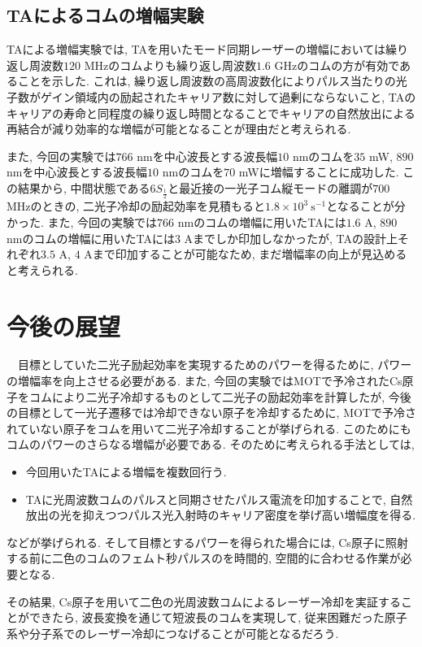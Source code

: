 \documentclass[uplatex, dvipdfmx, a4paper, report, papersize, 11pt]{jsbook}
\begin{document}
\subsection{TAによるコムの増幅実験}
TAによる増幅実験では, TAを用いたモード同期レーザーの増幅においては繰り返し周波数$120$ MHzのコムよりも繰り返し周波数$1.6$ GHzのコムの方が有効であることを示した. これは, 繰り返し周波数の高周波数化によりパルス当たりの光子数がゲイン領域内の励起されたキャリア数に対して過剰にならないこと, TAのキャリアの寿命と同程度の繰り返し時間となることでキャリアの自然放出による再結合が減り効率的な増幅が可能となることが理由だと考えられる. \par
また, 今回の実験では$766$ nmを中心波長とする波長幅$10$ nmのコムを$35$ mW, $890$ nmを中心波長とする波長幅$10$ nmのコムを$70$ mWに増幅することに成功した. この結果から, 中間状態である$6S_{\frac{1}{2}}$と最近接の一光子コム縦モードの離調が$700$ MHzのときの, 二光子冷却の励起効率を見積もると$1.8\times10^3\ \mathrm{s^{-1}}$となることが分かった. また, 今回の実験では$766$ nmのコムの増幅に用いたTAには$1.6$ A, $890$ nmのコムの増幅に用いたTAには$3$ Aまでしか印加しなかったが, TAの設計上それぞれ$3.5$ A, $4$ Aまで印加することが可能なため, まだ増幅率の向上が見込めると考えられる. \par

\section{今後の展望}
　目標としていた二光子励起効率を実現するためのパワーを得るために, パワーの増幅率を向上させる必要がある. また, 今回の実験ではMOTで予冷されたCs原子をコムにより二光子冷却するものとして二光子の励起効率を計算したが, 今後の目標として一光子遷移では冷却できない原子を冷却するために, MOTで予冷されていない原子をコムを用いて二光子冷却することが挙げられる. このためにもコムのパワーのさらなる増幅が必要である. そのために考えられる手法としては,
\begin{itemize}
  \item 今回用いたTAによる増幅を複数回行う.
  \item TAに光周波数コムのパルスと同期させたパルス電流を印加することで, 自然放出の光を抑えつつパルス光入射時のキャリア密度を挙げ高い増幅度を得る.
\end{itemize}
などが挙げられる.
そして目標とするパワーを得られた場合には, Cs原子に照射する前に二色のコムのフェムト秒パルスのを時間的, 空間的に合わせる作業が必要となる. \par
その結果, Cs原子を用いて二色の光周波数コムによるレーザー冷却を実証することができたら, 波長変換を通じて短波長のコムを実現して, 従来困難だった原子系や分子系でのレーザー冷却につなげることが可能となるだろう.
\end{document}
